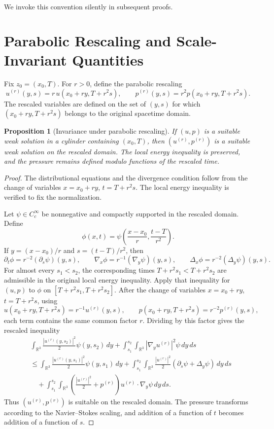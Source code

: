 \documentclass[11pt]{amsart}
\theoremstyle{plain}
\newtheorem{proposition}[proposition]{Proposition}
\theoremstyle{definition}
\theoremstyle{remark}
\numberwithin{equation}{section}
\begin{document}
\noindent We invoke this convention silently in subsequent proofs.

\section{Parabolic Rescaling and Scale-Invariant Quantities}

Fix \(z_0=(x_0,T)\).  For \(r>0\), define the parabolic rescaling
\[
  u^{(r)}(y,s)=r\,u(x_0+ry,T+r^2s),
  \qquad
  p^{(r)}(y,s)=r^2p(x_0+ry,T+r^2s).
\]
The rescaled variables are defined on the set of \((y,s)\) for which
\((x_0+ry,T+r^2s)\) belongs to the original spacetime domain.

\begin{proposition}[Invariance under parabolic rescaling]
If \((u,p)\) is a suitable weak solution in a cylinder containing
\((x_0,T)\), then
\((u^{(r)},p^{(r)})\) is a suitable weak solution on the rescaled domain.  The
local energy inequality is preserved, and the pressure remains defined modulo
functions of the rescaled time.
\end{proposition}

\begin{proof}
The distributional equations and the divergence condition follow from the
change of variables \(x=x_0+ry\), \(t=T+r^2s\).  The local energy inequality
is verified to fix the normalization.

Let \(\psi\in C_c^\infty\) be nonnegative and compactly supported in the
rescaled domain.  Define
\[
  \phi(x,t)=
  \psi\left(\frac{x-x_0}{r},\frac{t-T}{r^2}\right).
\]
If \(y=(x-x_0)/r\) and \(s=(t-T)/r^2\), then
\[
  \partial_t\phi=r^{-2}(\partial_s\psi)(y,s),\qquad
  \nabla_x\phi=r^{-1}(\nabla_y\psi)(y,s),\qquad
  \Delta_x\phi=r^{-2}(\Delta_y\psi)(y,s).
\]
For almost every \(s_1<s_2\), the corresponding times
\(T+r^2s_1<T+r^2s_2\) are admissible in the original local energy inequality.
Apply that inequality for \((u,p)\) to \(\phi\) on
\([T+r^2s_1,T+r^2s_2]\).  After the change of variables
\(x=x_0+ry\), \(t=T+r^2s\), using
\[
  u(x_0+ry,T+r^2s)=r^{-1}u^{(r)}(y,s),\qquad
  p(x_0+ry,T+r^2s)=r^{-2}p^{(r)}(y,s),
\]
each term contains the same common factor \(r\).  Dividing by this factor gives
the rescaled inequality
\[
\begin{aligned}
&\int_{\mathbb R^3}\frac{|u^{(r)}(y,s_2)|^2}{2}\psi(y,s_2)\,dy
 +\int_{s_1}^{s_2}\int_{\mathbb R^3}|\nabla_y u^{(r)}|^2\psi\,dy\,ds \\
&\le
 \int_{\mathbb R^3}\frac{|u^{(r)}(y,s_1)|^2}{2}\psi(y,s_1)\,dy
 +\int_{s_1}^{s_2}\int_{\mathbb R^3}
   \frac{|u^{(r)}|^2}{2}(\partial_s\psi+\Delta_y\psi)\,dy\,ds \\
&\quad
 +\int_{s_1}^{s_2}\int_{\mathbb R^3}
   \left(\frac{|u^{(r)}|^2}{2}+p^{(r)}\right)
   u^{(r)}\cdot\nabla_y\psi\,dy\,ds .
\end{aligned}
\]
Thus \((u^{(r)},p^{(r)})\) is suitable on the rescaled domain.  The pressure
transforms according to the Navier--Stokes scaling, and addition of a function
of \(t\) becomes addition of a function of \(s\).
\end{proof}
\end{document}
